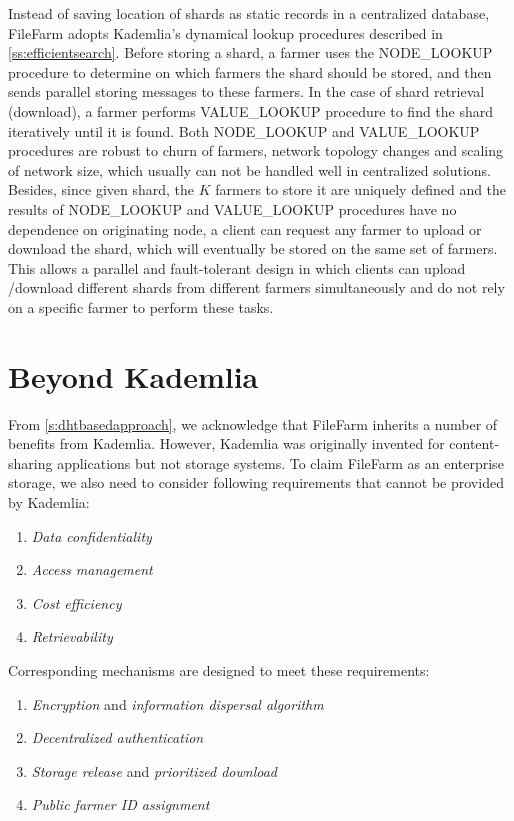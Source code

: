 Instead of saving location of shards as static records in a centralized database, FileFarm adopts Kademlia's dynamical lookup procedures described in \ref{ss:efficientsearch}. Before storing a shard, a farmer uses the NODE\_LOOKUP procedure to determine on which farmers the shard should be stored, and then sends parallel storing messages to these farmers. In the case of shard retrieval (download), a farmer performs VALUE\_LOOKUP procedure to find the shard iteratively until it is found. Both NODE\_LOOKUP and VALUE\_LOOKUP procedures are robust to churn of farmers, network topology changes and scaling of network size, which usually can not be handled well in centralized solutions. Besides, since given shard, the $K$ farmers to store it are uniquely defined and the results of NODE\_LOOKUP and VALUE\_LOOKUP procedures have no dependence on originating node, a client can request any farmer to upload or download the shard, which will eventually be stored on the same set of farmers. This allows a parallel and fault-tolerant design in which clients can upload /download different shards from different farmers simultaneously and do not rely on a specific farmer to perform these tasks.

\section{Beyond Kademlia}
\label{s:beyondkademlia}

From \ref{s:dhtbasedapproach}, we acknowledge that FileFarm inherits a number of benefits from Kademlia. However, Kademlia was originally invented for content-sharing applications but not storage systems. To claim FileFarm as an enterprise storage, we also need to consider following requirements that cannot be provided by Kademlia:

\begin{enumerate}
  \item \textit{Data confidentiality}
  \item \textit{Access management}
  \item \textit{Cost efficiency}
  \item \textit{Retrievability}
\end{enumerate}

\noindent Corresponding mechanisms are designed to meet these requirements:

\begin{enumerate}
  \item \textit{Encryption} and \textit{information dispersal algorithm}
  \item \textit{Decentralized authentication}
  \item \textit{Storage release} and \textit{prioritized download}
  \item \textit{Public farmer ID assignment}
\end{enumerate}

